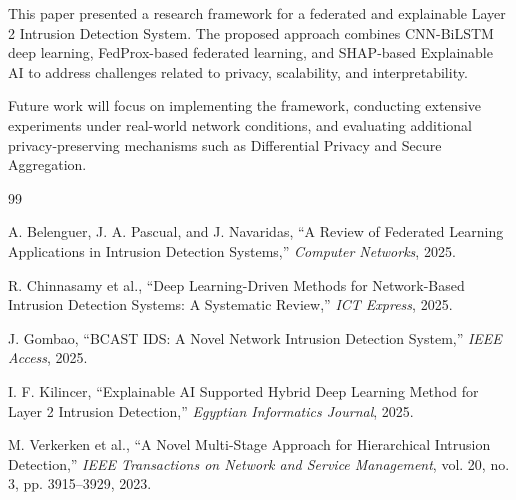 \documentclass[conference]{IEEEtran}
\begin{document}
This paper presented a research framework for a federated and explainable Layer 2 Intrusion Detection System. The proposed approach combines CNN-BiLSTM deep learning, FedProx-based federated learning, and SHAP-based Explainable AI to address challenges related to privacy, scalability, and interpretability.

Future work will focus on implementing the framework, conducting extensive experiments under real-world network conditions, and evaluating additional privacy-preserving mechanisms such as Differential Privacy and Secure Aggregation.



\begin{thebibliography}{99}

A. Belenguer, J. A. Pascual, and J. Navaridas,
``A Review of Federated Learning Applications in Intrusion Detection Systems,''
\emph{Computer Networks}, 2025.

R. Chinnasamy et al.,
``Deep Learning-Driven Methods for Network-Based Intrusion Detection Systems: A Systematic Review,''
\emph{ICT Express}, 2025.

J. Gombao,
``BCAST IDS: A Novel Network Intrusion Detection System,''
\emph{IEEE Access}, 2025.

I. F. Kilincer,
``Explainable AI Supported Hybrid Deep Learning Method for Layer 2 Intrusion Detection,''
\emph{Egyptian Informatics Journal}, 2025.

M. Verkerken et al.,
``A Novel Multi-Stage Approach for Hierarchical Intrusion Detection,''
\emph{IEEE Transactions on Network and Service Management},
vol. 20, no. 3, pp. 3915--3929, 2023.

\end{thebibliography}
\end{document}
